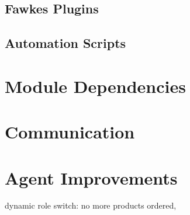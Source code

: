\subsection{Fawkes Plugins}
\subsection{Automation Scripts}


\section{Module Dependencies}
\label{sec:module_dependencies}


\section{Communication}
\label{sec:imp_communication}


\section{Agent Improvements}
\label{sec:agent_improvements}
dynamic role switch: no more products ordered, \cite{dynamic_role_assignment}
